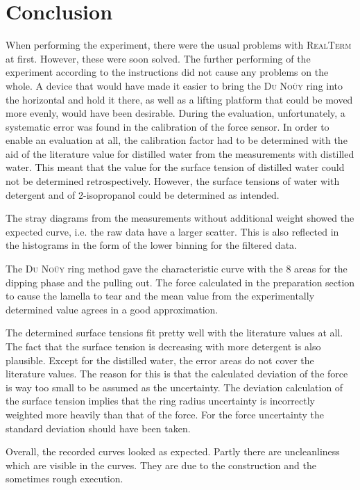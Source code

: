\chapter{Conclusion}
When performing the experiment, there were the usual problems with \textsc{RealTerm} at first. However, these were soon
solved. The further performing of the experiment according to the instructions did not cause any problems on the whole.
A device that would have made it easier to bring the \textsc{Du Noüy} ring into the horizontal and hold it there, as well
as a lifting platform that could be moved more evenly, would have been desirable. During the evaluation, unfortunately,
a systematic error was found in the calibration of the force sensor. In order to enable an evaluation at all, the calibration
factor had to be determined with the aid of the literature value for distilled water from the measurements with distilled water.
This meant that the value for the surface tension of distilled water could not be determined retrospectively. However, the
surface tensions of water with detergent and of 2-isopropanol could be determined as intended.\par
The stray diagrams from the measurements without additional weight showed the expected curve, i.e. the raw data have a
larger scatter. This is also reflected in the histograms in the form of the lower binning for the filtered data.\par
The \textsc{Du Noüy} ring method gave the characteristic curve with the 8 areas for the dipping phase and the pulling out.
The force calculated in the preparation section to cause the lamella to tear and the mean value from the experimentally
determined value agrees in a good approximation.\par
The determined surface tensions fit pretty well with the literature values at all. The fact that the surface tension is
decreasing with more detergent is also plausible. Except for the distilled water, the error areas do not cover the literature
values. The reason for this is that the calculated deviation of the force is way too small to be assumed as the uncertainty.
The deviation calculation of the surface tension implies that the ring radius uncertainty is incorrectly weighted more
heavily than that of the force. For the force uncertainty the standard deviation should have been taken.\par
Overall, the recorded curves looked as expected. Partly there are uncleanliness which are visible in the curves. They are
due to the construction and the sometimes rough execution.
